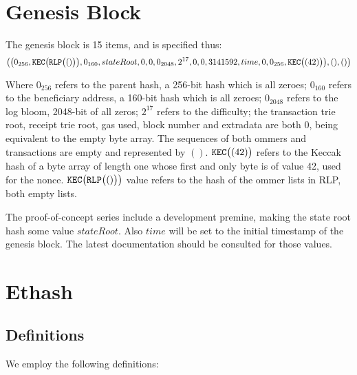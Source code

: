 \documentclass[9pt,oneside]{amsart}
\begin{document}
\hypertarget{GenesisBlock}{}
\section{Genesis Block}\label{app:genesis}

The genesis block is 15 items, and is specified thus:
\begin{equation}
\big( \big( 0_{256}, \mathtt{\tiny KEC}\big(\mathtt{\tiny RLP}\big( () \big)\big), 0_{160}, stateRoot, 0, 0, 0_{2048}, 2^{17}, 0, 0, 3141592, time, 0, 0_{256},  \mathtt{\tiny KEC}\big( (42) \big) \big), (), () \big)
\end{equation}

Where $0_{256}$ refers to the parent hash, a 256-bit hash which is all zeroes; $0_{160}$ refers to the beneficiary address, a 160-bit hash which is all zeroes; $0_{2048}$ refers to the log bloom, 2048-bit of all zeros; $2^{17}$ refers to the difficulty; the transaction trie root, receipt trie root, gas used, block number and extradata are both $0$, being equivalent to the empty byte array. The sequences of both ommers and transactions are empty and represented by $()$. $\mathtt{\tiny KEC}\big( (42) \big)$ refers to the Keccak hash of a byte array of length one whose first and only byte is of value 42, used for the nonce. $\mathtt{\tiny KEC}\big(\mathtt{\tiny RLP}\big( () \big)\big)$ value refers to the hash of the ommer lists in RLP, both empty lists.

The proof-of-concept series include a development premine, making the state root hash some value $stateRoot$. Also $time$ will be set to the initial timestamp of the genesis block. The latest documentation should be consulted for those values.

\section{Ethash}\label{app:ethash}
\subsection{Definitions}
We employ the following definitions:
\end{document}
